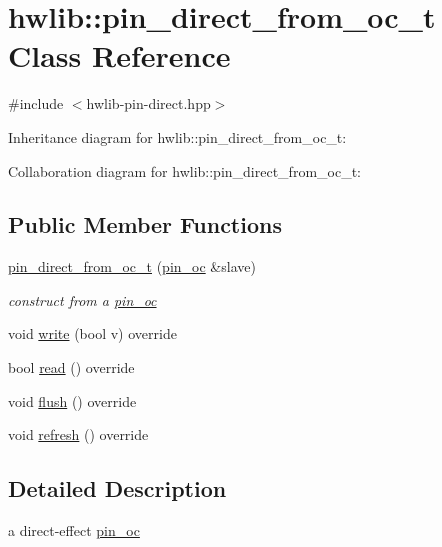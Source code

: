 \hypertarget{classhwlib_1_1pin__direct__from__oc__t}{}\section{hwlib\+:\+:pin\+\_\+direct\+\_\+from\+\_\+oc\+\_\+t Class Reference}
\label{classhwlib_1_1pin__direct__from__oc__t}


{\ttfamily \#include $<$hwlib-\/pin-\/direct.\+hpp$>$}



Inheritance diagram for hwlib\+:\+:pin\+\_\+direct\+\_\+from\+\_\+oc\+\_\+t\+:


Collaboration diagram for hwlib\+:\+:pin\+\_\+direct\+\_\+from\+\_\+oc\+\_\+t\+:
\subsection*{Public Member Functions}
\begin{DoxyCompactItemize}
\item 
\mbox{\label{classhwlib_1_1pin__direct__from__oc__t_aeb00c5708c996dfac4ef573622fcb017}} 
\hyperlink{classhwlib_1_1pin__direct__from__oc__t_aeb00c5708c996dfac4ef573622fcb017}{pin\+\_\+direct\+\_\+from\+\_\+oc\+\_\+t} (\hyperlink{classhwlib_1_1pin__oc}{pin\+\_\+oc} \&slave)
\begin{DoxyCompactList}\small\item\em construct from a \hyperlink{classhwlib_1_1pin__oc}{pin\+\_\+oc} \end{DoxyCompactList}\item 
void \hyperlink{classhwlib_1_1pin__direct__from__oc__t_a46ed21095c419bb3a8b720f3a8b00811}{write} (bool v) override
\item 
bool \hyperlink{classhwlib_1_1pin__direct__from__oc__t_af9243ffeb3095cefb13b7a3daf209339}{read} () override
\item 
void \hyperlink{classhwlib_1_1pin__direct__from__oc__t_a3009f8da456f04e889ee1d81e8bcf0b4}{flush} () override
\item 
void \hyperlink{classhwlib_1_1pin__direct__from__oc__t_ab18895f60f0b8f314da92711176d3464}{refresh} () override
\end{DoxyCompactItemize}


\subsection{Detailed Description}
a direct-\/effect \hyperlink{classhwlib_1_1pin__oc}{pin\+\_\+oc}

